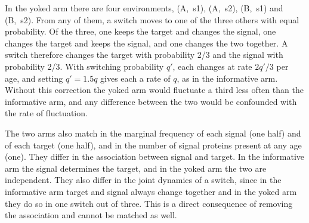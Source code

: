 In the yoked arm there are four environments, (A,~s1), (A,~s2), (B,~s1) and
(B,~s2). From any of them, a switch moves to one of the three others with equal
probability. Of the three, one keeps the target and changes the signal, one
changes the target and keeps the signal, and one changes the two together. A switch therefore
changes the target with probability 2/3 and the signal with probability 2/3. With switching probability $q'$, each changes at rate $2q'/3$ per age, and setting $q' = 1.5q$ gives each a rate of $q$, as in the informative arm. Without this
correction the yoked arm would fluctuate a third less often than the informative
arm, and any difference between the two would be confounded with the rate of
fluctuation.

The two arms also match in the marginal frequency of each signal (one half) and
of each target (one half), and in the number of signal proteins present at any
age (one). They differ in the association between signal and target. In the informative arm the signal determines the target, and in the yoked arm the two
are independent. They also differ in the joint dynamics of a switch, since in the
informative arm target and signal always change together and in the yoked arm
they do so in one switch out of three. This is a direct consequence of removing
the association and cannot be matched as well.

